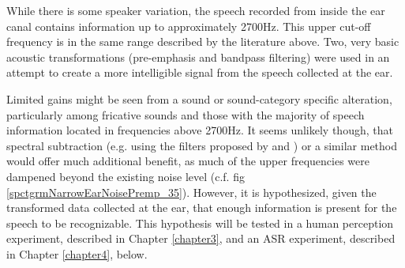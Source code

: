 \documentclass[dissertation,copyright]{uathesis}
\begin{document}
While there is some speaker variation, the speech recorded from inside the ear canal contains information up to approximately 2700Hz.  This upper cut-off frequency is in the same range described by the literature above.  Two, very basic acoustic transformations (pre-emphasis and bandpass filtering) were used in an attempt to create a more intelligible signal from the speech collected at the ear.

Limited gains might be seen from a sound or sound-category specific alteration, particularly among fricative sounds and those with the majority of speech information located in frequencies above 2700Hz.  It seems unlikely though, that spectral subtraction (e.g. using the filters proposed by \cite{hansen:97b} and \cite{reinfeldt:10}) or a similar method would offer much additional benefit, as much of the upper frequencies were dampened beyond the existing noise level (c.f. fig \ref{spctgrmNarrowEarNoisePremp_35}).  However, it is hypothesized, given the transformed data collected at the ear, that enough information is present for the speech to be recognizable.  This hypothesis will be tested in a human perception experiment, described in Chapter \ref{chapter3}, and an ASR experiment, described in Chapter \ref{chapter4}, below.









\end{document}
